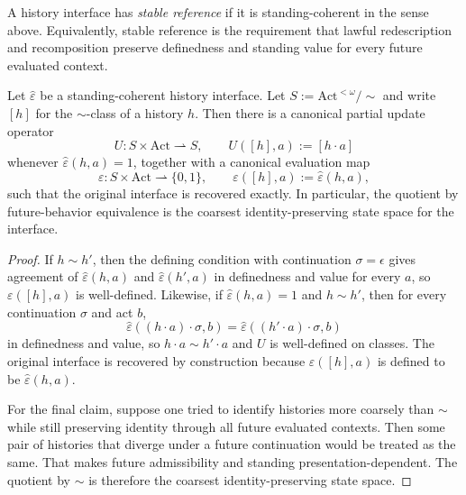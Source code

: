 \begin{definition}
A history interface has \emph{stable reference} if it is standing-coherent in the sense above. Equivalently, stable reference is the requirement that lawful redescription and recomposition preserve definedness and standing value for every future evaluated context.
\end{definition}

\begin{theorem}
\label{thm:canonical-state-transition-representation}
Let $\hat\varepsilon$ be a standing-coherent history interface. Let $S := \mathrm{Act}^{<\omega}/\!\sim$ and write $[h]$ for the $\sim$-class of a history $h$. Then there is a canonical partial update operator
\[
U : S \times \mathrm{Act} \rightharpoonup S, \qquad U([h],a):=[h\cdot a]
\]
whenever $\hat\varepsilon(h,a)=1$, together with a canonical evaluation map
\[
\varepsilon : S \times \mathrm{Act} \rightharpoonup \{0,1\}, \qquad \varepsilon([h],a):=\hat\varepsilon(h,a),
\]
such that the original interface is recovered exactly. In particular, the quotient by future-behavior equivalence is the coarsest identity-preserving state space for the interface.
\end{theorem}

\begin{proof}
If $h\sim h'$, then the defining condition with continuation $\sigma=\epsilon$ gives agreement of $\hat\varepsilon(h,a)$ and $\hat\varepsilon(h',a)$ in definedness and value for every $a$, so $\varepsilon([h],a)$ is well-defined. Likewise, if $\hat\varepsilon(h,a)=1$ and $h\sim h'$, then for every continuation $\sigma$ and act $b$,
\[
\hat\varepsilon((h\cdot a)\cdot \sigma,b)=\hat\varepsilon((h'\cdot a)\cdot \sigma,b)
\]
in definedness and value, so $h\cdot a \sim h'\cdot a$ and $U$ is well-defined on classes. The original interface is recovered by construction because $\varepsilon([h],a)$ is defined to be $\hat\varepsilon(h,a)$.

For the final claim, suppose one tried to identify histories more coarsely than $\sim$ while still preserving identity through all future evaluated contexts. Then some pair of histories that diverge under a future continuation would be treated as the same. That makes future admissibility and standing presentation-dependent. The quotient by $\sim$ is therefore the coarsest identity-preserving state space.\cite{MaleyAMetric}
\end{proof}

